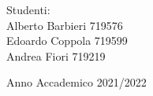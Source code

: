 \begin{titlepage}
\begin{flushleft}
    \end{flushleft}

    \vspace*{10mm}

    \begin{flushright}
        {\fontsize{17}{17}\selectfont 
            Studenti: \\
            Alberto Barbieri 719576 \\
            Edoardo Coppola 719599 \\
            Andrea Fiori 719219 \\
        }

    \end{flushright}
 
    \vspace*{30mm}

    \begin{center}
    {\fontsize{17}{17}\selectfont 
        Anno Accademico 2021/2022
    }
    \end{center}
    
    
\end{titlepage}
\restoregeometry